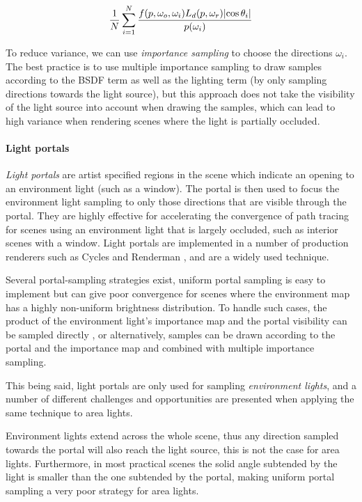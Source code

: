\begin{equation}
  \frac{1}{N} \sum_{i=1}^N \frac{f(p, \omega_o, \omega_i) L_d(p, \omega_r) \lvert\cos\theta_i\rvert}{p(\omega_i)}
\end{equation}

To reduce variance, we can use \emph{importance sampling} to choose the directions $\omega_i$. The best practice is to use multiple importance sampling \cite{veachROBUSTMONTECARLO} to draw samples according to the BSDF term as well as the lighting term (by only sampling directions towards the light source), but this approach does not take the visibility of the light source into account when drawing the samples, which can lead to high variance when rendering scenes where the light is partially occluded.

\paragraph{Light portals}
\emph{Light portals} are artist specified regions in the scene which indicate an opening to an environment light (such as a window). The portal is then used to focus the environment light sampling to only those directions that are visible through the portal. They are highly effective for accelerating the convergence of path tracing for scenes using an environment light that is largely occluded, such as interior scenes with a window. Light portals are implemented in a number of production renderers such as Cycles \cite{LightSettingsBlender} and Renderman \cite{PxrPortalLight}, and are a widely used technique. 

Several portal-sampling strategies exist, uniform portal sampling is easy to implement but can give poor convergence for scenes where the environment map has a highly non-uniform brightness distribution. To handle such cases, the product of the environment light's importance map and the portal visibility can be sampled directly \cite*[]{bitterliPortalMaskedEnvironment2015}, or alternatively, samples can be drawn according to the portal and the importance map and combined with multiple importance sampling.

This being said, light portals are only used for sampling \emph{environment lights}, and a number of different challenges and opportunities are presented when applying the same technique to area lights. 

Environment lights extend across the whole scene, thus any direction sampled towards the portal will also reach the light source, this is not the case for area lights. Furthermore, in most practical scenes the solid angle subtended by the light is smaller than the one subtended by the portal, making uniform portal sampling a very poor strategy for area lights.
